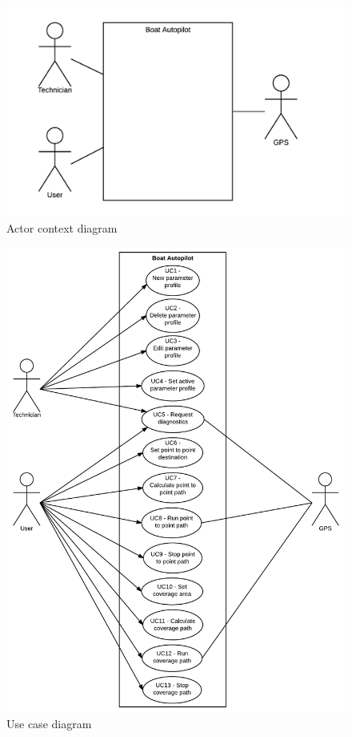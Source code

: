 \begin{figure}[H]
	\centering
	\includegraphics{Images/Actor_context_diagram.png}
	\caption{Actor context diagram}
\end{figure}

\begin{figure}[H]
	\centering
	\includegraphics[width=0.9\linewidth]{Images/Usecase_diagram}
	\caption{Use case diagram}
	\label{fig:usecasediagram}
\end{figure}


